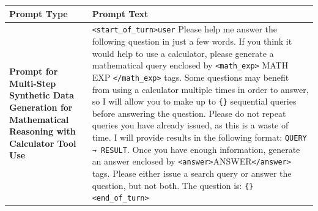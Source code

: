 \documentclass{article} %
\begin{document}
\begin{table}[h!]
    \centering
    \small %
    \begin{tabular}{|p{5cm}|p{8cm}|} %
        \hline
        \textbf{Prompt Type} & \textbf{Prompt Text} \\
        \hline
        \textbf{Prompt for Multi-Step Synthetic Data Generation for Mathematical Reasoning with Calculator Tool Use} & 
        \raggedright 
        \texttt{\textless start\_of\_turn\textgreater user} \newline
    Please help me answer the following question in just a few words. If you think it would help to use a calculator, please generate a mathematical query enclosed by \texttt{\textless math\_exp\textgreater} MATH EXP \texttt{\textless /math\_exp\textgreater} tags. \newline
    Some questions may benefit from using a calculator multiple times in order to answer, so I will allow you to make up to \texttt{\{\}} sequential queries before answering the question. \newline
    Please do not repeat queries you have already issued, as this is a waste of time. \newline
    I will provide results in the following format: \newline
    \texttt{QUERY → RESULT}. \newline
    Once you have enough information, generate an answer enclosed by \texttt{\textless answer\textgreater}ANSWER\texttt{\textless /answer\textgreater} tags. \newline
    Please either issue a search query or answer the question, but not both. \newline
    The question is: \texttt{\{\}} \newline
    \texttt{\textless end\_of\_turn\textgreater} \\
    \end{tabular}
\end{table}
\end{document}
